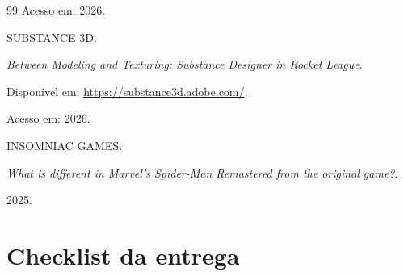 \documentclass[12pt,a4paper]{report}
\begin{document}
\begin{thebibliography}{99}
Acesso em: 2026.


SUBSTANCE 3D.

\textit{Between Modeling and Texturing: Substance Designer in Rocket League}.

Disponível em:
\url{https://substance3d.adobe.com/}.

Acesso em: 2026.


INSOMNIAC GAMES.

\textit{What is different in Marvel's Spider-Man Remastered from the original game?}.

2025.

\end{thebibliography}

\appendix

\chapter{Checklist da entrega}
\end{document}
